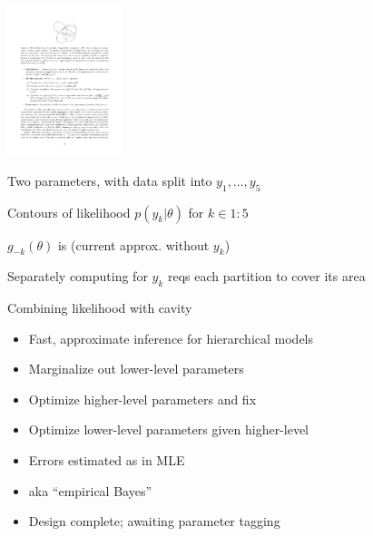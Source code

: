 \documentclass[10pt]{report}
\begin{document}
\vspace*{-6pt}
\begin{center}
\includegraphics[width=0.25\textwidth]{img/ep-cavity.pdf}
\end{center}
\vspace*{-8pt}
\begin{subitemize}
\item Two parameters, with data split into $y_1, \ldots, y_5$
\item Contours of likelihood $p(y_k | \theta)$ for $k \in 1{:}5$
\item $g_{-k}(\theta)$ is  (current
  approx. without $y_k$)
\item Separately computing for $y_k$ reqs each partition to cover its area
\item Combining likelihood with cavity 
\end{subitemize}

\begin{itemize}
\item Fast, approximate inference for hierarchical models
\item Marginalize out lower-level parameters
\item Optimize higher-level parameters and fix
\item Optimize lower-level parameters given higher-level
\item Errors estimated as in MLE
\item aka ``empirical Bayes''
\item Design complete; awaiting parameter tagging
\end{itemize}


\end{document}
